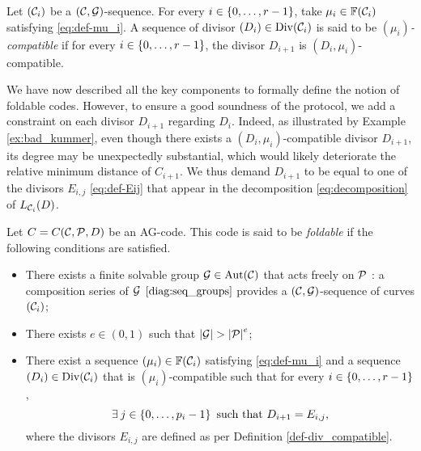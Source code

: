 \documentclass[10pt]{article}
\begin{document}
\begin{definition}[$(\mu_i)$-compatibility]\label{def-mu_i_compatible}
	Let $(\mathcal{C}_i)$ be a $(\mathcal{C},\mathcal{G})$-sequence. For every $i \in \left\{0,\dots,r-1\right\}$, take $\mu_i \in \mathbb{F}(\mathcal{C}_i)$ satisfying \eqref{eq:def-mu_i}. A sequence of divisor $(D_i) \in \operatorname{Div}(\mathcal{C}_i)$ is said to be \emph{$(\mu_i)$-compatible} if for every $i \in \left\{0,\dots,r-1\right\}$, the divisor $D_{i+1}$ is $(D_i,\mu_i)$-compatible.
\end{definition}

We have now described all the key components to formally define the notion of foldable codes. However, to ensure a good soundness of the protocol, we add a constraint on each divisor $D_{i+1}$ regarding $D_i$. Indeed, as illustrated by Example \ref{ex:bad_kummer}, even though there exists a $(D_i,\mu_i)$-compatible divisor $D_{i+1}$, its degree may be unexpectedly substantial, which would likely deteriorate the relative minimum distance of $C_{i+1}$. We thus demand $D_{i+1}$ to be equal to one of the divisors $E_{i,j}$ \eqref{eq:def-Eij} that appear in the decomposition \eqref{eq:decomposition} of $L_{\mathcal{C}_i}(D)$.


\begin{definition}\label{def:good_properties}
	Let $C =C(\mathcal{C},\mathcal{P},D)$ be an AG-code. This code is said to be \emph{foldable} if the following conditions are satisfied.
	\begin{itemize}
		\item There exists a finite solvable group $\mathcal{G} \in \operatorname{Aut}(\mathcal{C})$ that acts freely on $\mathcal{P}$ : a composition series of $\mathcal{G}$ $\eqref{diag:seq_groups}$ provides a $(\mathcal{C},\mathcal{G})$-sequence of curves $(\mathcal{C}_i)$;
		\item There exists $e \in (0,1)$ such that $\left|\mathcal{G}\right| > \left|\mathcal{P}\right|^e$;
		\item There exist a sequence $(\mu_i) \in \mathbb{F}(\mathcal{C}_i)$ satisfying \eqref{eq:def-mu_i} and a sequence $(D_i) \in \operatorname{Div}(\mathcal{C}_i)$ that is $(\mu_i)$-compatible such that for every $i \in \left\{0,\dots,r-1\right\}$,
		\begin{equation}\label{eq:cdt_Di+1}
			\exists \: j \in \left\{0,\dots,p_i-1\right\} \text{ such that } D_{i+1}=E_{i,j},
		\end{equation}
		where the divisors $E_{i, j}$ are defined as per Definition \ref{def-div_compatible}.
		
	\end{itemize}
\end{definition}
\end{document}
